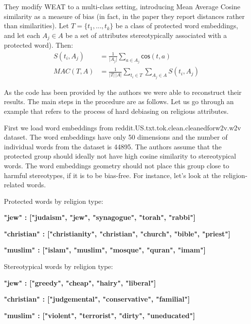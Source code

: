 \documentclass[
  12pt,
]{book}
\begin{document}
They modify WEAT to a multi-class setting, introducing Mean Average Cosine similarity as a measure of bias (in fact, in the paper they report distances rather than similarities). Let \(T = \{t_1, \dots, t_k\}\) be a class of protected word embeddings, and let each \(A_j\in A\) be a set of attributes stereotypically associated with a protected word). Then:
\begin{align}
S(t_i, A_j) & = \frac{1}{\vert A_j\vert}\sum_{a\in A_j}\mathsf{cos}(t,a) \\
MAC(T,A) & = \frac{1}{\vert T \vert \,\vert A\vert}\sum_{t_i \in T }\sum_{A_j \in A} S(t_i,A_j)
\end{align}

As the code has been provided by the authors we were able to reconstruct their results. The main steps in the procedure are as follows. Let us go through an example that refers to the process of hard debiasing on religious attributes.

First we load word embeddings from reddit.US.txt.tok.clean.cleanedforw2v.w2v dataset. The word embeddings have only 50 dimensions and the number of individual words from the dataset is 44895. The authors assume that the protected group should ideally not have high cosine similarity to stereotypical words. The word embeddings geometry should not place this group close to harmful stereotypes, if it is to be bias-free. For instance, let's look at the religion-related words.

Protected words by religion type:

\begin{minipage}{1.0\textwidth}
\textbf{"jew"       : ["judaism", "jew", "synagogue", "torah", "rabbi"]} 

\textbf{"christian" : ["christianity", "christian", "church", "bible", "priest"]}

\textbf{"muslim"    : ["islam", "muslim", "mosque", "quran", "imam"]}
\end{minipage}

Stereotypical words by religion type:

\begin{minipage}{1.0\textwidth}
\textbf{"jew"       : ["greedy", "cheap", "hairy", "liberal"]}

\textbf{"christian"       : ["judgemental", "conservative", "familial"]}

\textbf{"muslim"       : ["violent", "terrorist", "dirty", "uneducated"]}
\end{minipage}
\end{document}
